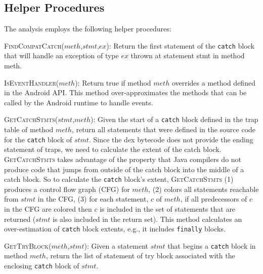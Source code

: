 \subsection{Helper Procedures}

The analysis employs the following helper procedures: 

\begin{description}[leftmargin=0cm,listparindent=0pt,itemindent=0cm]

\item \textsc{FindCompatCatch}($meth$,$stmt$,$ex$): Return the first
  statement of the \lstinline!catch! block that will handle an
  exception of type $ex$ thrown at statement stmt in method meth.

\item \textsc{IsEventHandler}($meth$): Return true if method $meth$
  overrides a method defined in the Android API.  This method
  over-approximates the methods that can be called by the Android
  runtime to handle events.

\item \textsc{GetCatchStmts}($stmt$,$meth$): Given the start of a
  \lstinline!catch! block defined in the trap table of method $meth$,
  return all statements that were defined in the source code for the
  \lstinline!catch! block of $stmt$.  Since the dex bytecode does not
  provide the ending statement of traps, we need to calculate the
  extent of the catch block.  \textsc{GetCatchStmts} takes advantage
  of the property that Java compilers do not produce code that jumps
  from outside of the catch block into the middle of a catch block.
  So to calculate the \lstinline!catch! block's extent,
  \textsc{GetCatchStmts} (1) produces a control flow graph (CFG) for
  $meth$, (2) colors all statements reachable from $stmt$ in the CFG,
  (3) for each statement, $c$ of $meth$, if all predecessors of $c$ in
  the CFG are colored then $c$ is included in the set of statements
  that are returned ($stmt$ is also included in the return set). This
  method calculates an over-estimation of \lstinline!catch! block
  extents, e.g., it includes \lstinline!finally! blocks.

\item \textsc{GetTryBlock}($meth$,$stmt$): Given a statement $stmt$
  that begins a \lstinline!catch! block in method $meth$, return the
  list of statement of try block associated with the enclosing
  \lstinline!catch! block of $stmt$.

\end{description}

